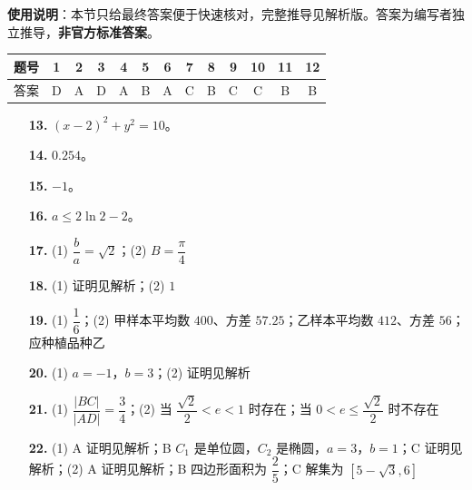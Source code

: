 
\begin{gknotice}
\textbf{使用说明}：本节只给最终答案便于快速核对，完整推导见解析版。答案为编写者独立推导，\textbf{非官方标准答案}。
\end{gknotice}

\begin{center}\begin{tabular}{ccccccccccccc}
\toprule
题号 & 1 & 2 & 3 & 4 & 5 & 6 & 7 & 8 & 9 & 10 & 11 & 12 \\
\midrule
答案 & D & A & D & A & B & A & C & B & C & C & B & B \\
\bottomrule
\end{tabular}\end{center}

\begin{itemize}[leftmargin=2.6em]
  \item[\textbf{13.}] $(x-2)^2+y^2=10$。
  \item[\textbf{14.}] $0.254$。
  \item[\textbf{15.}] $-1$。
  \item[\textbf{16.}] $a\leqslant2\ln2-2$。
\end{itemize}

\begin{itemize}[leftmargin=2.6em]
  \item[\textbf{17.}] (1) $\dfrac ba=\sqrt2$；(2) $B=\dfrac\pi4$
  \item[\textbf{18.}] (1) 证明见解析；(2) $1$
  \item[\textbf{19.}] (1) $\dfrac16$；(2) 甲样本平均数 $400$、方差 $57.25$；乙样本平均数 $412$、方差 $56$；应种植品种乙
  \item[\textbf{20.}] (1) $a=-1$，$b=3$；(2) 证明见解析
  \item[\textbf{21.}] (1) $\dfrac{|BC|}{|AD|}=\dfrac34$；(2) 当 $\dfrac{\sqrt2}2<e<1$ 时存在；当 $0<e\leqslant\dfrac{\sqrt2}2$ 时不存在
  \item[\textbf{22.}] (1) A 证明见解析；B $C_1$ 是单位圆，$C_2$ 是椭圆，$a=3$，$b=1$；C 证明见解析；(2) A 证明见解析；B 四边形面积为 $\dfrac25$；C 解集为 $[5-\sqrt3,6]$
\end{itemize}

